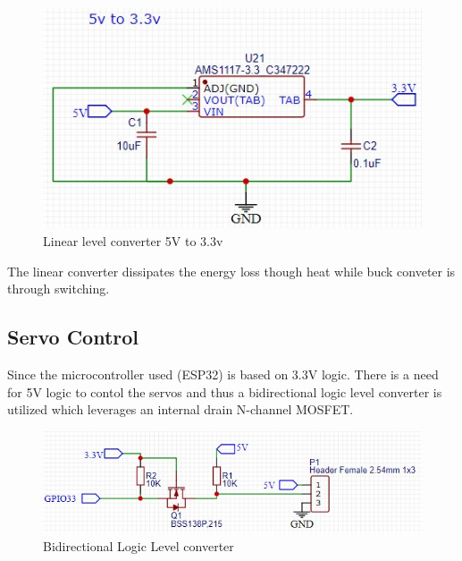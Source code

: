 \begin{center}
	\begin{figure}[!h]
	\centering
	\includegraphics{Figures/5233}
	\caption[Linear Voltage Converter]{Linear level converter 5V to 3.3v}
	\end{figure}
\end{center}

The linear converter dissipates the energy loss though heat while buck conveter is through switching.

\subsection{Servo Control}
Since the microcontroller used (ESP32) is based on 3.3V logic. There is a need for 5V logic to contol the servos and thus a bidirectional logic level converter is utilized which leverages an internal drain N-channel MOSFET. 
\begin{center}
	\begin{figure}[!h]
	\centering
	\includegraphics{Figures/logik}
	\caption[Bidirectional Logic Level converter]{Bidirectional Logic Level converter}
	\end{figure}
\end{center}
